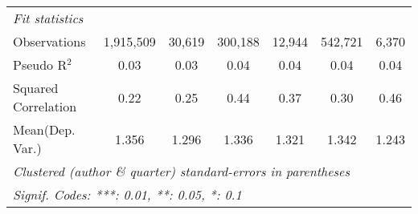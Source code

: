 \begin{tabular}{lcccccc}
   \midrule
   \emph{Fit statistics}\\
   Observations                                               & 1,915,509      & 30,619  & 300,188       & 12,944       & 542,721        & 6,370\\  
   Pseudo R$^2$                                               & 0.03           & 0.03    & 0.04          & 0.04         & 0.04           & 0.04\\  
   Squared Correlation                                        & 0.22           & 0.25    & 0.44          & 0.37         & 0.30           & 0.46\\  
Mean(Dep. Var.) & 1.356 & 1.296 & 1.336 & 1.321 & 1.342 & 1.243 \\
   \midrule \midrule
   \multicolumn{7}{l}{\emph{Clustered (author \& quarter) standard-errors in parentheses}}\\
   \multicolumn{7}{l}{\emph{Signif. Codes: ***: 0.01, **: 0.05, *: 0.1}}\\
\end{tabular}
\par\endgroup
